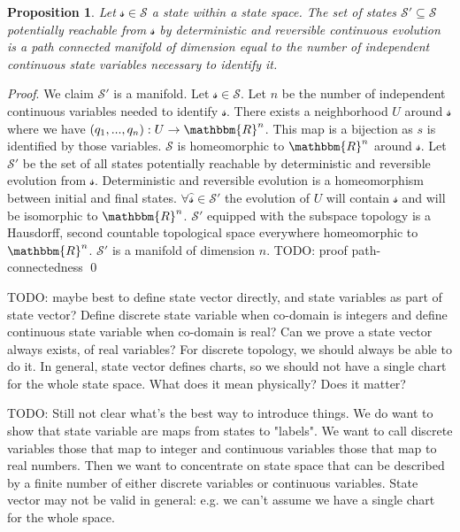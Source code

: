 \documentclass[aps,pra,10pt,twocolumn,floatfix,nofootinbib]{revtex4-1}
\newtheorem{prop}{Proposition}[section]
\theoremstyle{definition}
\renewenvironment{proof}{\emph{Proof}.}{\qed}
\begin{document}
\begin{prop}\label{continuous_state_space}
	Let $\mathcal{s} \in \mathcal{S}$ a state within a state space. The set of states $\mathcal{S}'\subseteq\mathcal{S}$ potentially reachable from $\mathcal{s}$ by deterministic and reversible continuous evolution is a path connected manifold of dimension equal to the number of independent continuous state variables necessary to identify it.
\end{prop}

\begin{proof}
	We claim $\mathcal{S}'$ is a manifold. Let $\mathcal{s} \in \mathcal{S}$. Let $n$ be the number of independent continuous variables needed to identify $\mathcal{s}$. There exists a neighborhood $U$ around $\mathcal{s}$ where we have $(q_1,...,q_n):U\rightarrow \mathbbm{R}^n$. This map is a bijection as $s$ is identified by those variables. $\mathcal{S}$ is homeomorphic to $\mathbbm{R}^n$ around  $\mathcal{s}$. Let $\mathcal{S}'$ be the set of all states potentially reachable by deterministic and reversible evolution from $\mathcal{s}$. Deterministic and reversible evolution is a homeomorphism between initial and final states. $\forall \hat{\mathcal{s}} \in \mathcal{S}'$ the evolution of $U$ will contain $\mathcal{s}$ and will be isomorphic to $\mathbbm{R}^n$. $\mathcal{S}'$ equipped with the subspace topology is a Hausdorff, second countable topological space everywhere homeomorphic to $\mathbbm{R}^n$. $\mathcal{S}'$ is a manifold of dimension $n$.
	TODO: proof path-connectedness
\end{proof}




TODO: maybe best to define state vector directly, and state variables as part of state vector? Define discrete state variable when co-domain is integers and define continuous state variable when co-domain is real? Can we prove a state vector always exists, of real variables? For discrete topology, we should always be able to do it. In general, state vector defines charts, so we should not have a single chart for the whole state space. What does it mean physically? Does it matter?


TODO: Still not clear what's the best way to introduce things. We do want to show that state variable are maps from states to "labels". We want to call discrete variables those that map to integer and continuous variables those that map to real numbers. Then we want to concentrate on state space that can be described by a finite number of either discrete variables or continuous variables. State vector may not be valid in general: e.g. we can't assume we have a single chart for the whole space. 
\end{document}
